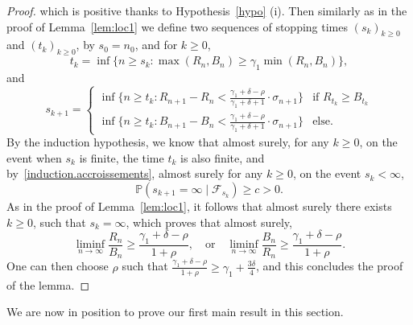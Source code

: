 \documentclass[11pt]{article}
\newcommand{\1}{{\text{\Large $\mathfrak 1$}}}
\begin{document}
\begin{proof}
which is positive thanks to Hypothesis~\ref{hypo} (i). Then similarly as in the proof of Lemma~\ref{lem:loc1} we define two sequences of stopping times 
$(s_k)_{k\ge 0}$ and $(t_k)_{k\ge 0}$, by 
$s_0 = n_0$, and for $k\ge 0$, 
$$
t_k = \inf\{n\ge s_k : \max(R_n,B_n) \ge \gamma_1 \min(R_n,B_n)\}, 
$$ 
and 
\begin{equation*}
s_{k+1} = \left\{ 
\begin{array}{ll}
\inf\{n \ge t_k : R_{n+1} - R_n < \frac{\gamma_1 + \delta-\rho}{\gamma_1 + \delta+1} \cdot \sigma_{n+1}\} & \text{if }R_{t_k}\ge B_{t_k} \\
 \inf\{n \ge t_k : B_{n+1} - B_n < \frac{\gamma_1 + \delta-\rho}{\gamma_1 + \delta+1} \cdot \sigma_{n+1}\} & \text{else.} 
\end{array}
\right. 
\end{equation*}
By the induction hypothesis, we know that almost surely, for any $k\ge 0$, on the event when $s_k$ is finite, the time $t_k$ is also finite, and by~\eqref{induction.accroissements}, almost surely for any $k\ge 0$, on the event $s_k<\infty$, 
$$\mathbb P(s_{k+1} = \infty \mid \mathcal F_{s_k}) \ge c>0. $$  
As in the proof of Lemma~\ref{lem:loc1}, it follows that almost surely there exists $k\ge 0$, such that $s_k = \infty$, which proves that almost surely, 
$$\liminf_{n\to \infty} \frac{R_n}{B_n}\ge \frac{\gamma_1 + \delta - \rho}{1+ \rho}, \quad \text{or}\quad \liminf_{n\to \infty} \frac{B_n}{R_n}\ge \frac{\gamma_1 + \delta - \rho}{1+ \rho}. $$
One can then choose $\rho$ such that $\frac{\gamma_1 + \delta - \rho}{1+ \rho}\ge \gamma_1 + \frac{3\delta}{4}$, and this concludes the proof of the lemma.  
\end{proof}

We are now in position to prove our first main result in this section. 
\end{document}
